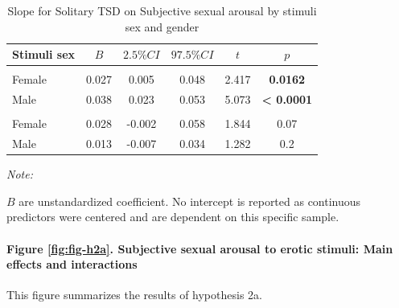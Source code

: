 \documentclass[
  bookmarksnumbered]{article}
\begin{document}
\begin{table}[H]
\centering
\caption{\label{tab:unnamed-chunk-23}Slope for Solitary TSD on 
        Subjective sexual arousal by stimuli sex and gender}
\centering
\begin{threeparttable}
\begin{tabular}[t]{lccccc}
\toprule
Stimuli sex & $B$ & $2.5\% CI$ & $97.5\% CI$ & $t$ & $p$\\
\midrule
\addlinespace[0.3em]
\multicolumn{6}{l}{\cellcolor{lightgray}{Gender: Women}}\\
\hspace{1em}Female & 0.027 & 0.005 & 0.048 & 2.417 & \textbf{0.0162}\\
\hspace{1em}Male & 0.038 & 0.023 & 0.053 & 5.073 & \textbf{< 0.0001}\\
\addlinespace[0.3em]
\multicolumn{6}{l}{\cellcolor{lightgray}{Gender: Men}}\\
\hspace{1em}Female & 0.028 & -0.002 & 0.058 & 1.844 & 0.07\\
\hspace{1em}Male & 0.013 & -0.007 & 0.034 & 1.282 & 0.2\\
\bottomrule
\end{tabular}
\begin{tablenotes}[para]
\item \textit{Note: } 
\item $B$ are unstandardized coefficient.
           No intercept is reported as continuous predictors were centered
           and are dependent on this specific sample.
\end{tablenotes}
\end{threeparttable}
\end{table}

\paragraph{Figure \ref{fig:fig-h2a}. Subjective sexual arousal to erotic stimuli: Main effects and interactions}\label{figure-reffigfig-h2a.-subjective-sexual-arousal-to-erotic-stimuli-main-effects-and-interactions}

This figure summarizes the results of hypothesis 2a.
\end{document}
